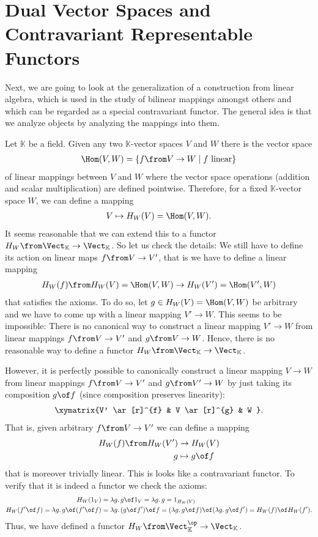 \documentclass{article}
\theoremstyle{definition}
\begin{document}
\section{Dual Vector Spaces and Contravariant Representable Functors}
Next, we are going to look at the generalization of a construction from linear algebra, which is used in the study of bilinear mappings amongst others and which can be regarded as a special contravariant functor. The general idea is that we analyze objects by analyzing the mappings into them.

Let $\mathbb K$ be a field. Given any two $\mathbb K$-vector spaces $V$ and $W$ there is the vector space 
\begin{align*}
  \Hom(V,W)=\{f\from V\to W\mid f \text{ linear}\}
\end{align*}
of linear mappings between $V$ and $W$ where the vector space operations (addition and scalar multiplication) are defined pointwise. Therefore, for a fixed $\mathbb K$-vector space $W$, we can define a mapping
\begin{align*}
  V\mapsto H_W(V)=\Hom(V,W).
\end{align*}
It seems reasonable that we can extend this to a functor $H_W\from\Vect_{\mathbb K}\to\Vect_{\mathbb K}$. So let us check the details: We still have to define its action on linear maps $f\from V\to V'$, that is we have to define a linear mapping 
\begin{align*}
  H_W(f)\from H_W(V)=\Hom(V,W)\to H_W(V')=\Hom(V',W)
\end{align*}
 that satisfies the axioms. To do so, let $g\in H_W(V)=\Hom(V,W)$ be arbitrary and we have to come up with a linear mapping $V'\to W$. This seems to be impossible: There is no canonical way to construct a linear mapping $V'\to W$ from linear mappings $f\from V\to V'$ and $g\from V\to W$. Hence, there is no reasonable way to define a functor $H_W\from\Vect_{\mathbb K}\to\Vect_{\mathbb K}$.

However, it is perfectly possible to canonically construct a linear mapping $V\to W$ from linear mappings $f\from V\to V'$ and $g\from V'\to W$ by just taking its composition $g\of f$ (since composition preserves linearity):
\begin{align*}
  \xymatrix{V' \ar[r]^{f} & V \ar[r]^{g} & W }.
\end{align*}
That is, given arbitrary $f\from V\to V'$ we can define a mapping
\begin{align*}
  H_W(f)\from H_W(V')&\to H_W(V)\\
  g&\mapsto g\of f
\end{align*}
that is moreover trivially linear. This is looks like a contravariant functor. To verify that it is indeed a functor we check the axioms:
\begin{align*}
  H_W(1_V)&=\lambda g\ldotp g\of 1_V=\lambda g\ldotp g=1_{H_W(V)}\\
  H_W(f'\of f)=\lambda g\ldotp g\of (f'\of f)&=\lambda g\ldotp (g\of f')\of f=(\lambda g\ldotp g\of f)\of (\lambda g\ldotp g\of f')=H_W(f)\of H_W(f').
\end{align*}
Thus, we have defined a functor $H_W\from\Vect_{\mathbb K}^\op\to\Vect_{\mathbb K}$. 
\end{document}
